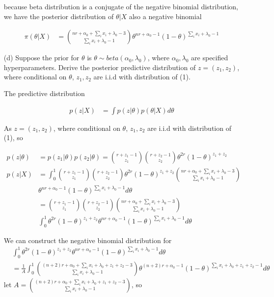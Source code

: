\documentclass[11pt]{article} %
\begin{document}
\begin{itemize}
because beta distribution is a conjugate of the negative binomial distribution, we have the posterior distribution of $\theta|X$ also a negative binomial

	\begin{align*}
	\pi(\theta | X) & = {nr+\alpha_0+ \sum_i x_i + \lambda_0-3 \choose \sum_i x_i + \lambda_0-1} \theta^{nr + \alpha_0-1} (1-\theta)^{\sum_i x_i + \lambda_0-1}
\end{align*}

	\item[(d)] Suppose the prior for $\theta$ is $\theta \sim beta(\alpha_0, \lambda_0)$, where $\alpha_0, \lambda_0$ are specified hyperparameters. Derive the posterior predictive distribution of $z=(z_1, z_2)$, where conditional on $\theta$, $z_1, z_2$ are i.i.d with distribution of (1).
	
	The predictive distribution 
	
	\begin{align*}
		p(z | X) & = \int p(z| \theta) p(\theta | X) d \theta
	\end{align*}

As $z=(z_1, z_2)$, where conditional on $\theta$, $z_1, z_2$ are i.i.d with distribution of (1), so

\begin{align*}
	p(z | \theta) & = p(z_1| \theta) p(z_2|\theta) = {r+z_1-1 \choose z_1} {r+z_2-1 \choose z_2} \theta^{2r} (1-\theta)^{z_1+z_2} \\
	p(z | X) & = \int_{0}^{1} {r+z_1-1 \choose z_1} {r+z_2-1 \choose z_2} \theta^{2r} (1-\theta)^{z_1+z_2}  {nr+\alpha_0+ \sum_i x_i + \lambda_0-3 \choose \sum_i x_i + \lambda_0-1} \\
	& \theta^{nr + \alpha_0-1} (1-\theta)^{\sum_i x_i + \lambda_0-1} d \theta\\
	&= {r+z_1-1 \choose z_1} {r+z_2-1 \choose z_2} {nr+\alpha_0+ \sum_i x_i + \lambda_0-3 \choose \sum_i x_i + \lambda_0-1} \\
	& \int_{0}^{1}  \theta^{2r} (1-\theta)^{z_1+z_2} \theta^{nr + \alpha_0-1} (1-\theta)^{\sum_i x_i + \lambda_0-1} d \theta
\end{align*}

We can construct the negative binomial distribution for
\begin{align*}
	& \int_{0}^{1}  \theta^{2r} (1-\theta)^{z_1+z_2} \theta^{nr + \alpha_0-1} (1-\theta)^{\sum_i x_i + \lambda_0-1} d \theta \\
	&= \frac{1}{A} \int_{0}^{1} {(n+2) r + \alpha_0 + \sum_i x_i + \lambda_0 + z_1+z_2 -3 \choose \sum_i x_i + \lambda_0-1} \theta^{(n+2) r + \alpha_0-1} (1-\theta)^{\sum_i x_i + \lambda_0 + z_1+z_2 -1} d \theta 
\end{align*}
let $A = {(n+2) r + \alpha_0 + \sum_i x_i + \lambda_0 + z_1+z_2 -3 \choose \sum_i x_i + \lambda_0-1}$, so


\end{itemize}
\end{document}
